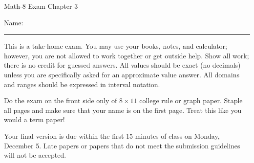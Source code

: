 \documentclass[letterpaper,12pt,fleqn]{article}
\begin{document}
\begin{center}
\Large Math-8 Exam Chapter 3
\end{center}

\vspace{0.5in}

Name: \rule{4in}{1pt}

\vspace{0.5in}

This is a take-home exam. You may use your books, notes, and calculator;
however, you are not allowed to work together or get outside help. Show all
work; there is no credit for guessed answers. All values should be exact
(no decimals) unless you are specifically asked for an approximate value
answer. All domains and ranges should be expressed in interval notation.

\begin{textbf}
  Do the exam on the front side only of $8\times11$ college rule or
  graph paper. Staple all pages and make sure that your name is on the first
  page. Treat this like you would a term paper!

  Your final version is due within the first 15 minutes of class on Monday,
  December 5. Late papers or papers that do not meet the submission guidelines
  will not be accepted.
\end{textbf}

\vspace{0.5in}
\end{document}
